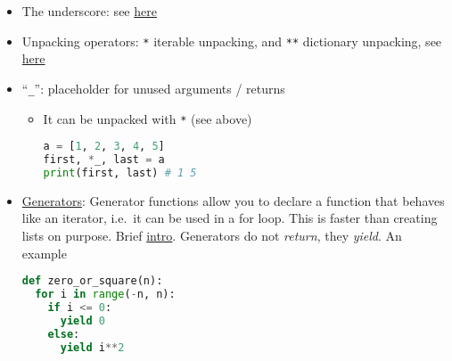 \documentclass[a4paper,12pt,%
              final%
              ]{article}
\begin{document}
\begin{itemize}
\begin{itemize}
    \end{itemize}
  \item The underscore: see \href{https://dbader.org/blog/meaning-of-underscores-in-python}{here}
  \item Unpacking operators: \verb|*| iterable unpacking, and \verb|**| dictionary unpacking, see \href{https://geekflare.com/python-unpacking-operators/}{here}
  \item ``\verb|_|'': placeholder for unused arguments / returns
    \begin{itemize}
      \item It can be unpacked with \verb|*| (see above)
\begin{lstlisting}[language=python]
a = [1, 2, 3, 4, 5]
first, *_, last = a
print(first, last) # 1 5
\end{lstlisting}
    \end{itemize}
  \item \href{https://wiki.python.org/moin/Generators}{Generators}: Generator functions allow you to declare a function that behaves like an iterator, i.e.\ it can be used in a for loop. This is faster than creating lists on purpose. Brief \href{https://www.programiz.com/python-programming/generator}{intro}. Generators do not \emph{return}, they \emph{yield}. An example
\begin{lstlisting}[language=python]
def zero_or_square(n):
  for i in range(-n, n):
    if i <= 0:
      yield 0
    else:
      yield i**2


\end{lstlisting}
\end{itemize}
\end{document}
